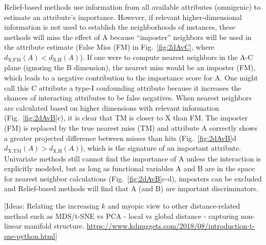 \documentclass[10pt,letterpaper]{article}\usepackage[]{graphicx}\usepackage[]{color}
\begin{document}
Relief-based methods use information from all available attributes (omnigenic) to estimate an attribute's importance. However, if relevant higher-dimensional information is not used to establish the neighborhoods of instances, these methods will miss the effect of A because ``imposter'' neighbors will be used in the attribute estimate (False Miss (FM) in Fig.~\ref{fig:2dAvC}, where $d_{\text{X,FM}}(A)<d_{\text{X,H}}(A)$).  If one were to compute nearest neighbors in the A-C plane (ignoring the B dimension), the nearest miss would be an imposter (FM), which leads to a negative contribution to the importance score for A. One might call this C attribute a type-I confounding attribute because it increases the chances of interacting attributes to be false negatives. When nearest neighbors are calculated based on higher dimensions with relevant information (Fig.~\ref{fig:2dAvB}c), it is clear that TM is closer to X than FM. The imposter (FM) is replaced by the true nearest miss (TM) and attribute A correctly shows a greater projected difference between misses than hits (Fig.~\ref{fig:2dAvB}d $d_{\text{X,TM}}(A)>d_{\text{X,H}}(A)$), which is the signature of an important attribute. Univariate methods still cannot find the importance of A unless the interaction is explicitly modeled, but as long as functional variables A and B are in the space for nearest neighbor calculations (Fig.~\ref{fig:2dAvB}c-d), imposters can be excluded and Relief-based methods will find that A (and B) are important discriminators. 


[Ideas: Relating the increasing $k$ and myopic view to other distance-related method such as MDS/t-SNE vs PCA - local vs global distance - capturing non-linear manifold structure. \url{https://www.kdnuggets.com/2018/08/introduction-t-sne-python.html}]
\end{document}
